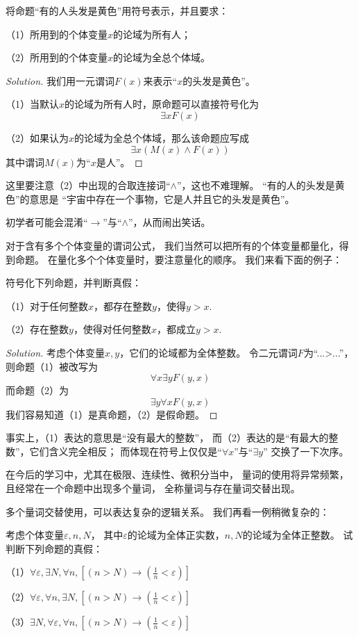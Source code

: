 \begin{example}
将命题“有的人头发是黄色”用符号表示，并且要求：

（1）所用到的个体变量$x$的论域为所有人；

（2）所用到的个体变量$x$的论域为全总个体域。
\end{example}

\begin{proof}[Solution]
我们用一元谓词$F(x)$来表示“$x$的头发是黄色”。

（1）当默认$x$的论域为所有人时，原命题可以直接符号化为
$$\exists xF(x)$$

（2）如果认为$x$的论域为全总个体域，那么该命题应写成
$$\exists x(M(x)\wedge F(x))$$
其中谓词$M(x)$为“$x$是人”。
\end{proof}

这里要注意（2）中出现的合取连接词“$\wedge$”，这也不难理解。
“有的人的头发是黄色”的意思是
“宇宙中存在一个事物，它是人并且它的头发是黄色”。

初学者可能会混淆“$\rightarrow$”与“$\wedge$”，从而闹出笑话。\vs

对于含有多个个体变量的谓词公式，
我们当然可以把所有的个体变量都量化，得到命题。
在量化多个个体变量时，要注意量化的顺序。
我们来看下面的例子：

\begin{example}符号化下列命题，并判断真假：

（1）对于任何整数$x$，都存在整数$y$，使得$y>x$.

（2）存在整数$y$，使得对任何整数$x$，都成立$y>x$.
\end{example}

\begin{proof}[Solution]
考虑个体变量$x,y$，它们的论域都为全体整数。
令二元谓词$F$为“...>...”，则命题（1）被改写为
$$\forall x\exists yF(y,x)$$
而命题（2）为
$$\exists y\forall x F(y,x)$$
我们容易知道（1）是真命题，（2）是假命题。
\end{proof}

事实上，（1）表达的意思是“没有最大的整数”，
而（2）表达的是“有最大的整数”，它们含义完全相反；
而体现在符号上仅仅是“$\forall x$”与“$\exists y$”
交换了一下次序。

在今后的学习中，尤其在极限、连续性、微积分当中，
量词的使用将异常频繁，且经常在一个命题中出现多个量词，
全称量词与存在量词交替出现。

多个量词交替使用，可以表达复杂的逻辑关系。
我们再看一例稍微复杂的：

\begin{example}考虑个体变量$\varepsilon,n,N$，
其中$\varepsilon$的论域为全体正实数，$n,N$的论域为全体正整数。
试判断下列命题的真假：

（1）$\forall\varepsilon,\exists N,\forall n,[(n>N)
\rightarrow(\frac{1}{n}<\varepsilon)]$

（2）$\forall\varepsilon,\forall n,\exists N,[(n>N)
\rightarrow(\frac{1}{n}<\varepsilon)]$

（3）$\exists N,\forall\varepsilon,\forall n,[(n>N)
\rightarrow(\frac{1}{n}<\varepsilon)]$
\end{example}

